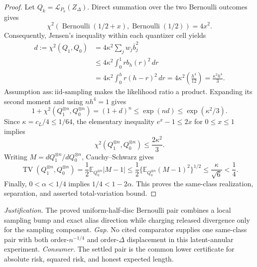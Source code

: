 \documentclass{article}
\begin{document}
\begin{proof}
Let \(Q_k=\mathcal L_{P_k}(Z_\Delta)\).  Direct summation over the two Bernoulli outcomes gives
\[
 \chi^2\!\left(\operatorname{Bernoulli}(1/2+x),
                    \operatorname{Bernoulli}(1/2)\right)=4x^2.
\]
Consequently, Jensen's inequality within each quantizer cell yields
\[
 \begin{aligned}
 d:=\chi^2(Q_1,Q_0)
 &=4\kappa^2\sum_jw_j\overline b_j^2\\
 &\leq4\kappa^2\int_0^1rb_h(r)^2\,dr\\
 &=4\kappa^2\int_0^h r(h-r)^2\,dr
 =4\kappa^2\left(\frac{h^4}{12}\right)
 =\frac{\kappa^2h^4}{3}.
 \end{aligned}
\]
Assumption \(\mathrm{ass:iid\text{-}sampling}\) makes the likelihood ratio a product.  Expanding its second moment and using \(nh^4=1\) gives
\[
 1+\chi^2(Q_1^{\otimes n},Q_0^{\otimes n})
 =(1+d)^n
 \leq\exp(nd)
 \leq\exp(\kappa^2/3).
\]
Since \(\kappa=c_L/4\leq1/64\), the elementary inequality \(e^x-1\leq2x\) for \(0\leq x\leq1\) implies
\[
 \chi^2(Q_1^{\otimes n},Q_0^{\otimes n})
 \leq\frac{2\kappa^2}{3}.
\]
Writing \(M=dQ_1^{\otimes n}/dQ_0^{\otimes n}\), Cauchy--Schwarz gives
\[
 \operatorname{TV}(Q_1^{\otimes n},Q_0^{\otimes n})
 =\frac12\mathbb E_{Q_0^{\otimes n}}|M-1|
 \leq\frac12\{\mathbb E_{Q_0^{\otimes n}}(M-1)^2\}^{1/2}
 \leq\frac{\kappa}{\sqrt6}<\frac14.
\]
Finally, \(0<\alpha<1/4\) implies \(1/4<1-2\alpha\).  This proves the same-class realization, separation, and asserted total-variation bound.
\end{proof}
\par\smallskip\noindent \textit{Justification.} The proved uniform-half-disc Bernoulli pair combines a local sampling bump and exact alias direction while charging released divergence only for the sampling component. \textit{Gap.} No cited comparator supplies one same-class pair with both order-\(n^{-1/4}\) and order-\(\Delta\) displacement in this latent-annular experiment. \textit{Consumer.} The settled pair is the common lower certificate for absolute risk, squared risk, and honest expected length.
\end{document}
